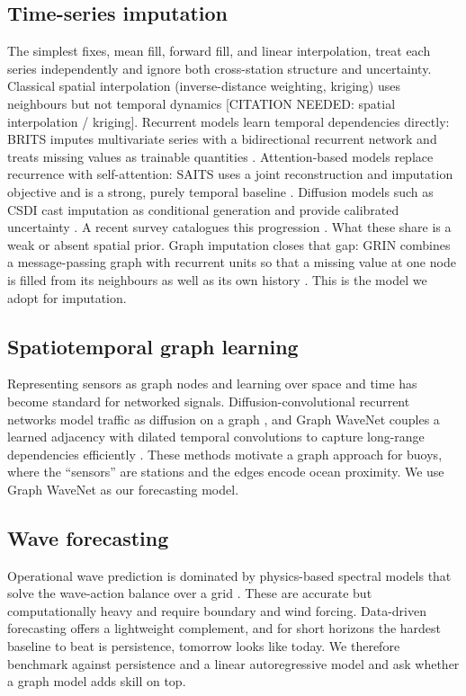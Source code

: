 \documentclass[11pt]{article}
\begin{document}
\subsection{Time-series imputation}
The simplest fixes, mean fill, forward fill, and linear interpolation, treat
each series independently and ignore both cross-station structure and
uncertainty. Classical spatial interpolation (inverse-distance weighting,
kriging) uses neighbours but not temporal dynamics
[CITATION NEEDED: spatial interpolation / kriging]. Recurrent models learn
temporal dependencies directly: BRITS imputes multivariate series with a
bidirectional recurrent network and treats missing values as trainable
quantities \citep{brits}. Attention-based models replace recurrence with
self-attention: SAITS uses a joint reconstruction and imputation objective and
is a strong, purely temporal baseline \citep{saits}. Diffusion models such as
CSDI cast imputation as conditional generation and provide calibrated
uncertainty \citep{csdi}. A recent survey catalogues this progression
\citep{survey2024}. What these share is a weak or absent spatial prior. Graph
imputation closes that gap: GRIN combines a message-passing graph with recurrent
units so that a missing value at one node is filled from its neighbours as well
as its own history \citep{grin}. This is the model we adopt for imputation.

\subsection{Spatiotemporal graph learning}
Representing sensors as graph nodes and learning over space and time has become
standard for networked signals. Diffusion-convolutional recurrent networks model
traffic as diffusion on a graph \citep{dcrnn}, and Graph WaveNet couples a
learned adjacency with dilated temporal convolutions to capture long-range
dependencies efficiently \citep{gwn}. These methods motivate a graph approach for
buoys, where the ``sensors'' are stations and the edges encode ocean proximity.
We use Graph WaveNet as our forecasting model.

\subsection{Wave forecasting}
Operational wave prediction is dominated by physics-based spectral models that
solve the wave-action balance over a grid \citep{wavewatch3,booij1999}.
These are accurate but computationally heavy and require boundary and wind
forcing. Data-driven forecasting offers a lightweight complement, and for
short horizons the hardest baseline to beat is persistence, tomorrow looks like
today. We therefore benchmark against persistence and a linear autoregressive
model and ask whether a graph model adds skill on top.
\end{document}

